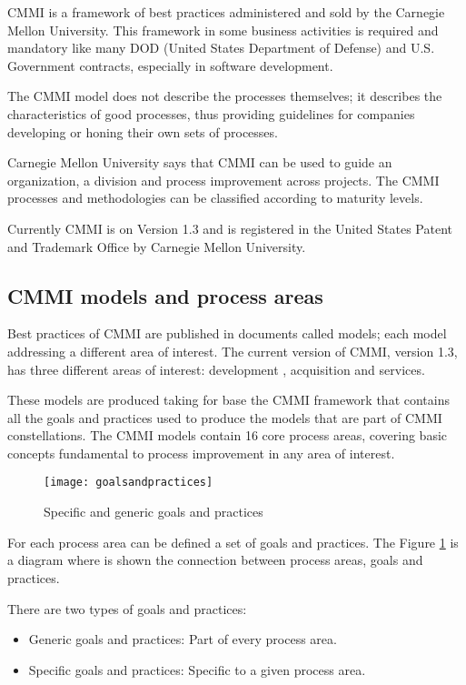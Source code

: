 CMMI is a framework of best practices administered and sold by the Carnegie Mellon University. This framework in some business activities is required and mandatory like many DOD (United States Department of Defense) and U.S. Government contracts, especially in software development.

The CMMI model does not describe the processes themselves; it describes the characteristics of good processes, thus providing guidelines for companies developing or honing their own sets of processes.

Carnegie Mellon University says that CMMI can be used to guide an organization, a division and process improvement across projects. The CMMI processes and methodologies can be classified according to maturity levels.

Currently CMMI is on Version 1.3 and is registered in the United States Patent and Trademark Office by Carnegie Mellon University.

\subsection{CMMI models and process areas}
Best practices of CMMI are published in documents called models; each model addressing a different area of interest. The current version of CMMI, version 1.3, has three different areas of interest: development \citep{Chrissis2006}, acquisition and services.

These models are produced taking for base the CMMI framework that contains all the goals and practices used to produce the models that are part of CMMI constellations. The CMMI models contain 16 core process areas, covering basic concepts fundamental to process improvement in any area of interest. 

\begin{figure}[h]
	\begin{center}
		\leavevmode
		\texttt{[image: goalsandpractices]}
		\caption{Specific and generic goals and practices}
		\label{fig:goalsandpractices}
	\end{center}
\end{figure}


For each process area can be defined a set of goals and practices. The Figure \ref{fig:goalsandpractices} is a diagram where is shown the connection between process areas, goals and practices. 

There are two types of goals and practices:
\begin{itemize}
	\item Generic goals and practices: Part of every process area.
	\item Specific goals and practices: Specific to a given process area.
\end{itemize}

